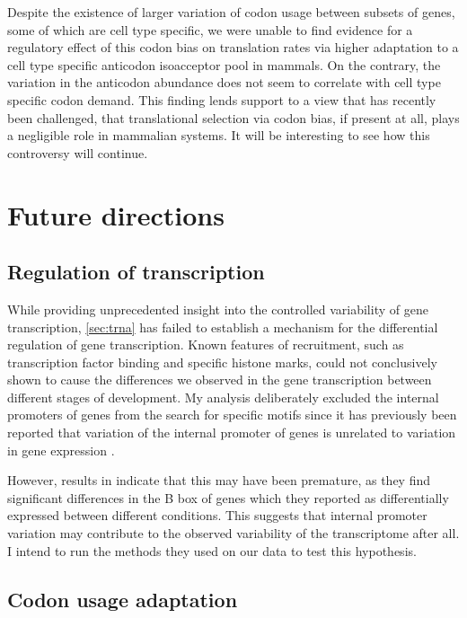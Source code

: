 Despite the existence of larger variation of codon usage between subsets of
genes, some of which are cell type specific, we were unable to find evidence for
a regulatory effect of this codon bias on translation rates via higher
adaptation to a cell type specific \trna anticodon isoacceptor pool in mammals.
On the contrary, the variation in the \trna anticodon abundance does not seem
to correlate with cell type specific codon demand. This finding lends support to
a view that has recently been challenged, that translational selection via codon
bias, if present at all, plays a negligible role in mammalian systems. It will
be interesting to see how this controversy will continue.

\section{Future directions}

\subsection{Regulation of \trna transcription}

While providing unprecedented insight into the controlled variability of \trna gene
transcription, \cref{sec:trna} has failed to establish a mechanism for the
differential regulation of \trna gene transcription. Known features of 
recruitment, such as transcription factor binding and specific histone marks,
could not conclusively shown to cause the differences we observed in the \trna
gene transcription between different stages of development. My analysis
deliberately excluded the internal promoters of \trna genes from the search for
specific motifs since it has previously been reported that variation of the
internal promoter of \trna genes is unrelated to variation in gene expression
\citep{Oler:2010,Canella:2012}.

However, results in \citet{Gingold:2014} indicate that this may have been
premature, as they find significant differences in the B box of \trna genes
which they reported as differentially expressed between different conditions.
This suggests that internal promoter variation may contribute to the observed
variability of the \trna transcriptome after all. I intend to run the methods
they used on our data to test this hypothesis.

\subsection{Codon usage adaptation}

